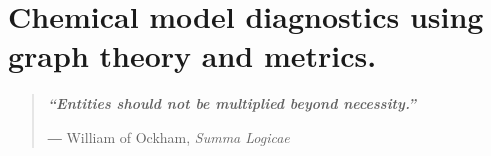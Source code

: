 

\chapter{ Chemical model diagnostics using graph theory and metrics.  }


\cleardoublepage{}
\restoregeometry
\vspace*{0.15\paperheight}


\begin{center}
\begin{quotation}
  \large{\emph{\textbf{``Entities should not be multiplied beyond necessity.''} }  }  \\
  \begin{flushright}
   ― William of Ockham, \textit{Summa Logicae}
  \end{flushright}
 \end{quotation}
\end{center}

\blankpage
\doublespacing


 
  
   
%    
 
 
% 
% 
% 
% 
% 



